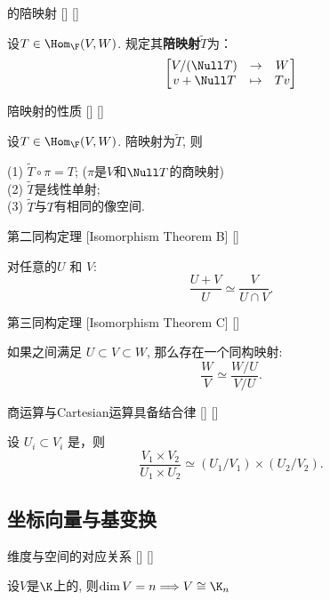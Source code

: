 \documentclass[UTF8]{ctexart}
\begin{document}
		\begin{dfn}
			[]
			{ 的陪映射}
			[]
			[]

			设$T\in\Hom_{\F}(V,W)$. 规定其\textbf{陪映射}$\tilde{T}$为：
			\[\begin{bmatrix}
				V/(\Null T)&\to&W\\
				v+\Null T&\mapsto&Tv
			\end{bmatrix}\]
		\end{dfn}

		\begin{ppt}
			[]
			{陪映射的性质}
			[]
			[]

			设$T\in\Hom_{\F}(V,W)$. 陪映射为$\tilde{T}$, 则

			(1) $\tilde{T}\circ\pi=T$; ($\pi$是$V$和$\Null T$的商映射)\\
			(2) $\tilde{T}$是线性单射;\\
			(3) $\tilde{T}$与$T$有相同的像空间.
		\end{ppt}

		\begin{thm}
			[]
			{第二同构定理}
			[Isomorphism Theorem B]
			[]

			对任意的 $U$ 和 $V$:
			\[
			\frac{U + V}{U} \simeq \frac{V}{U \cap V}. 
			\]
		\end{thm}
		\begin{thm}
			[]
			{第三同构定理}
			[Isomorphism Theorem C]
			[]

			如果 之间满足 $U \subset V \subset W$, 那么存在一个同构映射:
			\[
			\frac{W}{V} \simeq \frac{W / U}{V / U}.
			\]
		\end{thm}

		\begin{crl}
			[]
			{商运算与Cartesian运算具备结合律}
			[]
			[]

			设 $U_i \subset V_i$ 是，则
			\[
			\frac{V_1 \times V_2}{U_1 \times U_2} \simeq (U_1/V_1) \times (U_2/V_2).
			\]
		\end{crl}
        
	
	\subsection{坐标向量与基变换}
		
		\begin{thm}
			[]
			{维度与空间的对应关系}
			[]
			[]

			设$V$是$\K$上的, 则$\dim V=n\Longrightarrow V\cong\K_n$
		\end{thm}
  
\end{document}
